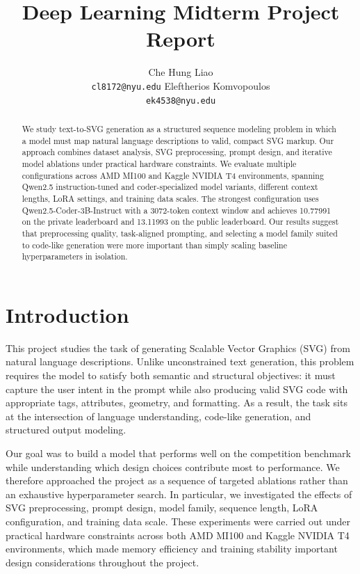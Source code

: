 \documentclass[11pt]{article}
\title{Deep Learning Midterm Project Report}
\author{
  Che Hung Liao \\
  \texttt{cl8172@nyu.edu}
  \And
  Eleftherios Komvopoulos \\
  \texttt{ek4538@nyu.edu}
}
\begin{document}
\maketitle

\begin{abstract}
We study text-to-SVG generation as a structured sequence modeling problem in
which a model must map natural language descriptions to valid, compact SVG
markup. Our approach combines dataset analysis, SVG preprocessing, prompt
design, and iterative model ablations under practical hardware constraints. We
evaluate multiple configurations across AMD MI100 and Kaggle NVIDIA T4
environments, spanning Qwen2.5 instruction-tuned and coder-specialized model
variants, different context lengths, LoRA settings, and training data scales.
The strongest configuration uses Qwen2.5-Coder-3B-Instruct with a 3072-token
context window and achieves 10.77991 on the private leaderboard and 13.11993
on the public leaderboard. Our results suggest that preprocessing quality,
task-aligned prompting, and selecting a model family suited to code-like
generation were more important than simply scaling baseline hyperparameters in
isolation.
\end{abstract}

\section{Introduction}

This project studies the task of generating Scalable Vector Graphics (SVG)
from natural language descriptions. Unlike unconstrained text generation, this
problem requires the model to satisfy both semantic and structural objectives:
it must capture the user intent in the prompt while also producing valid SVG
code with appropriate tags, attributes, geometry, and formatting. As a
result, the task sits at the intersection of language understanding, code-like
generation, and structured output modeling.

Our goal was to build a model that performs well on the competition benchmark
while understanding which design choices contribute most to performance. We
therefore approached the project as a sequence of targeted ablations rather
than an exhaustive hyperparameter search. In particular, we investigated the
effects of SVG preprocessing, prompt design, model family, sequence length,
LoRA configuration, and training data scale. These experiments were carried
out under practical hardware constraints across both AMD MI100 and Kaggle
NVIDIA T4 environments, which made memory efficiency and training stability
important design considerations throughout the project.
\end{document}
